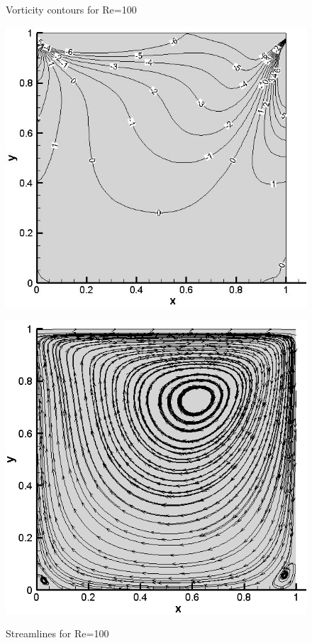 \documentclass[12pt]{elsarticle}
\begin{document}
	\begin{figure}[h]
		\caption{Vorticity contours for Re=100}
		\centering\includegraphics[width=0.8\linewidth]{17_50_50_re_100_TVD_stream_vorticity}
		\caption{Streamlines for Re=100}
		\centering\includegraphics[width=0.8\linewidth]{18_50_50_re_100_TVD_stream}
		\label{End:50x50_RE:100}
	\end{figure}
	\clearpage
	
\end{document}
